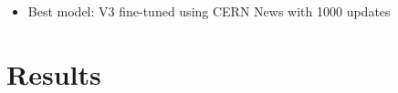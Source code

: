 \documentclass[landscape]{article}
\begin{document}
\begin{itemize}
	\item Best model: V3 fine-tuned using CERN News with 1000 updates
\end{itemize}
\begin{table}[ht]
\centering
{}
\end{table}


\cp
\section*{Results}
\vspace*{10mm}
\end{document}
